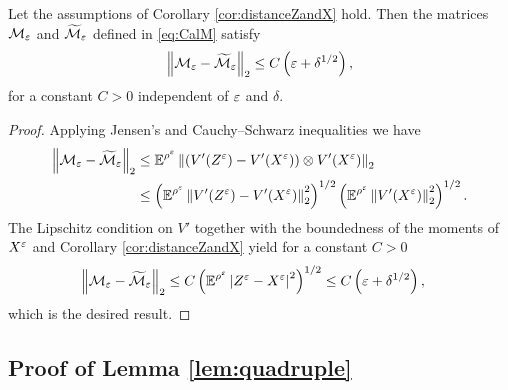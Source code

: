 \documentclass[10pt]{article}
\begin{document}
\begin{appendices}
\begin{lemma}\label{lem:distanceMandTildeM} Let the assumptions of Corollary \ref{cor:distanceZandX} hold. Then the matrices $\mathcal M_\varepsilon$ and $\widetilde{\mathcal M}_\varepsilon$ defined in \eqref{eq:CalM} satisfy
	\begin{equation}
	\left\|\mathcal M_\varepsilon - \widetilde{\mathcal M}_\varepsilon\right\|_2 \leq C\left(\varepsilon + \delta^{1/2}\right),
	\end{equation}
	for a constant $C > 0$ independent of $\varepsilon$ and $\delta$.
\end{lemma}
\begin{proof} Applying Jensen's and Cauchy--Schwarz inequalities we have
	\begin{equation}
	\begin{aligned}
	\left\|\mathcal M_\varepsilon - \widetilde{\mathcal M}_\varepsilon\right\|_2 &\leq \operatorname{\mathbb{E}}^{\rho^\varepsilon} \left\|\left(V'(Z^\varepsilon) - V'(X^\varepsilon)\right) \otimes V'(X^\varepsilon)\right\|_2 \\
	&\leq \left(\operatorname{\mathbb{E}}^{\rho^\varepsilon}\left\|V'(Z^\varepsilon) - V'(X^\varepsilon)\right\|_2^2\right)^{1/2} \left(\operatorname{\mathbb{E}}^{\rho^\varepsilon} \left\|V'(X^\varepsilon)\right\|_2^{2}\right)^{1/2}.
	\end{aligned}
	\end{equation}
	The Lipschitz condition on $V'$ together with the boundedness of the moments of $X^\varepsilon$ and Corollary \ref{cor:distanceZandX} yield for a constant $C > 0$
	\begin{equation}
	\begin{aligned}
	\left\|\mathcal M_\varepsilon - \widetilde{\mathcal M}_\varepsilon\right\|_2 &\leq C\left(\operatorname{\mathbb{E}}^{\rho^\varepsilon}\left\lvert Z^\varepsilon - X^\varepsilon\right\rvert^{2}\right)^{1/2} \leq C \left(\varepsilon + \delta^{1/2} \right),
	\end{aligned}
	\end{equation}
	which is the desired result.
\end{proof}

\subsection{Proof of Lemma \ref{lem:quadruple}}


\end{appendices}
\end{document}
